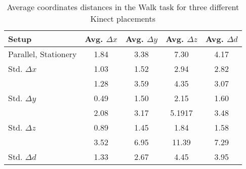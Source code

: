 \begin{table}[!htb]
\centering
\begin{tabularx}{1.0\columnwidth}{||X c c c c||} 
 \hline
 \textbf{Setup} & Avg. $\Delta x$ & Avg. $\Delta y$ & Avg. $\Delta z$ & Avg. $\Delta d$ \\ [0.5ex] 
 \hline\hline
Parallel, Stationery & 1.84 & 3.38 & 7.30 & 4.17 \\
 \hline
 Std. $\Delta x$ & 1.03 & 1.52 & 2.94 & 2.82 \\
 \hline
  & 1.28 & 3.59 & 4.35 & 3.07 \\
 \hline
 Std. $\Delta y$ & 0.49 & 1.50 & 2.15 & 1.60 \\
 \hline
  & 2.08 & 3.17 & 5.1917 & 3.48 \\
 \hline
 Std. $\Delta z$ & 0.89 & 1.45 & 1.84 & 1.58 \\
 \hline
  & 3.52 & 6.95 & 11.39 & 7.29 \\
 \hline
 Std. $\Delta d$ & 1.33 & 2.67 & 4.45 & 3.95 \\
 \hline
\end{tabularx}
\caption{Average coordinates distances in the Walk task for three different Kinect placements}
\label{table:overall_coordinates_values}
\end{table}
